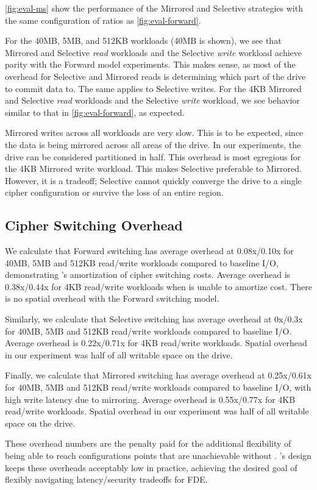 

\cref{fig:eval-ms} show the performance of the Mirrored and Selective strategies
with the same configuration of ratios as \cref{fig:eval-forward}.

For the 40MB, 5MB, and 512KB workloads (40MB is shown), we see that Mirrored and
Selective \emph{read} workloads and the Selective \emph{write} workload achieve
parity with the Forward model experiments. This makes sense, as most of the
overhead for Selective and Mirrored reads is determining which part of the drive
to commit data to. The same applies to Selective writes. For the 4KB Mirrored
and Selective \emph{read} workloads and the Selective \emph{write} workload, we
see behavior similar to that in \cref{fig:eval-forward}, as expected.

Mirrored writes across all workloads are very slow. This is to be expected,
since the data is being mirrored across all areas of the drive. In our
experiments, the drive can be considered partitioned in half. This overhead is
most egregious for the 4KB Mirrored write workload. This makes Selective
preferable to Mirrored. However, it is a tradeoff; Selective cannot quickly
converge the drive to a single cipher configuration or survive the loss of an
entire region.


\subsection{Cipher Switching Overhead}\label{subsec:eval-overhead}

We calculate that Forward switching has average overhead at 0.08x/0.10x for
40MB, 5MB and 512KB read/write workloads compared to baseline I/O, demonstrating
\sys's amortization of cipher switching costs. Average overhead is\\0.38x/0.44x
for 4KB read/write workloads when \sys is unable to amortize cost. There is no
spatial overhead with the Forward switching model.

Similarly, we calculate that Selective switching has average overhead at 0x/0.3x
for 40MB, 5MB and 512KB read/write workloads compared to baseline I/O. Average
overhead is 0.22x/0.71x for 4KB read/write workloads. Spatial overhead in our
experiment was half of all writable space on the drive.

Finally, we calculate that Mirrored switching has average overhead at
0.25x/0.61x for 40MB, 5MB and 512KB read/write workloads compared to baseline
I/O, with high write latency due to mirroring. Average overhead is 0.55x/0.77x
for 4KB read/write workloads. Spatial overhead in our experiment was half of all
writable space on the drive.

These overhead numbers are the penalty paid for the additional flexibility of
being able to reach configurations points that are unachievable without \sys.
\sys's design keeps these overheads acceptably low in practice, achieving the
desired goal of flexibly navigating latency/security tradeoffs for FDE.
